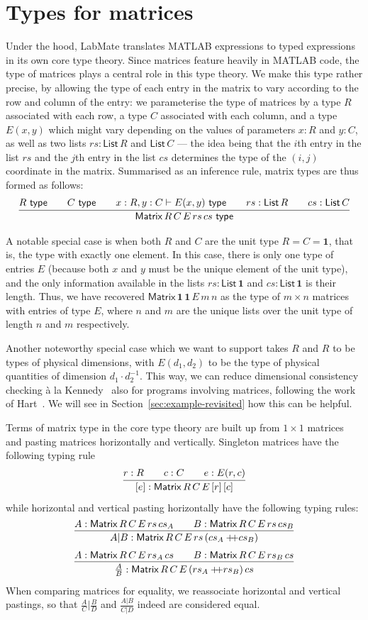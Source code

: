 \documentclass{IMEKO2024}
\newcommand{\istype}[1]{#1\ \textsf{type}}
\newcommand{\append}{+\!\!\!+}
\newcommand{\hjux}[2]{{#1}|{#2}}
\newcommand{\vjux}[2]{\frac{#1}{#2}}
\newcommand{\One}{\mathbf{1}}
\newcommand{\Matrix}[5]{\mathsf{Matrix}\,#1\,#2\,#3\,#4\,#5}
\newcommand{\List}[1]{\mathsf{List}\,#1}
\begin{document}
\section{Types for matrices}

Under the hood, LabMate translates MATLAB expressions to typed
expressions in its own core type theory.
%
Since matrices feature heavily in MATLAB code, the type of matrices
plays a central role in this type theory.
%
We make this type rather precise, by allowing the type of each entry
in the matrix to vary according to the row and column of the entry:
%
we parameterise the type of matrices by a type $R$ associated with
each row, a type $C$ associated with each column, and a type $E(x,y)$
which might vary depending on the values of parameters $x : R$ and
$y : C$, as well as two lists $rs : \List{R}$ and $\List{C}$ --- the
idea being that the $i$th entry in the list $rs$ and the $j$th entry
in the list $cs$ determines the type of the $(i, j)$ coordinate in the
matrix.
%
Summarised as an inference rule, matrix types are thus formed as follows:
%
\[
  \infer{\istype{\Matrix{R}{C}{E}{rs}{cs}}}
  {
    \istype{R}
    &\quad
    \istype{C}
    &\quad
    x : R, y : C \vdash \istype{E(x,y)}
    &\quad
    rs : \List{R}
    &\quad
    cs : \List{C}
  }
\]

A notable special case is when both $R$ and $C$ are the unit type
$R = C = \One$, that is, the type with exactly one element.
%
In this case, there is only one type of entries $E$ (because both $x$
and $y$ must be the unique element of the unit type), and the only
information available in the lists $rs : \List{\One}$ and
$cs : \List{\One}$ is their length.
%
Thus, we have recovered $\Matrix{\One}{\One}{E}{m}{n}$ as the type of
$m \times n$ matrices with entries of type $E$, where $n$ and $m$ are
the unique lists over the unit type of length $n$ and $m$
respectively.

Another noteworthy special case which we want to support takes $R$ and
$R$ to be types of physical dimensions, with $E(d_1, d_2)$ to be the
type of physical quantities of dimension $d_1 \cdot d_2^{-1}$.
%
This way, we can reduce dimensional consistency checking \`a la
Kennedy~\cite{kennedyUOM} also for programs involving matrices,
following the work of Hart~\cite{hart}.
%
We will see in Section~\ref{sec:example-revisited} how this can be helpful.

Terms of matrix type in the core type theory are built up from
$1 \times 1$ matrices and pasting matrices horizontally and vertically.
%
Singleton matrices have the following typing rule
\[
  \infer{[e] : \Matrix{R}{C}{E}{[r]}{[c]}}
    {r : R
      &\quad
      c : C
      &\quad
      e : E(r, c)
    }
\]
%
while horizontal and vertical pasting horizontally have the following
typing rules:
\[
  \infer{\hjux{A}{B} : \Matrix{R}{C}{E}{rs}{(cs_A \append cs_B)}}
  {
    A : \Matrix{R}{C}{E}{rs}{cs_A}
    &\quad
    B : \Matrix{R}{C}{E}{rs}{cs_B}
  }
\]
\[
  \infer{\vjux{A}{B} : \Matrix{R}{C}{E}{(rs_A \append rs_B)}{cs}}
  {
    A : \Matrix{R}{C}{E}{rs_A}{cs}
    &\quad
    B : \Matrix{R}{C}{E}{rs_B}{cs}
  }
\]
When comparing matrices for equality, we reassociate horizontal and
vertical pastings, so that $\hjux{\vjux{A}{C}}{\vjux{B}{D}}$ and
$\vjux{\hjux{A}{B}}{\hjux{C}{D}}$ indeed are considered equal.
\end{document}
